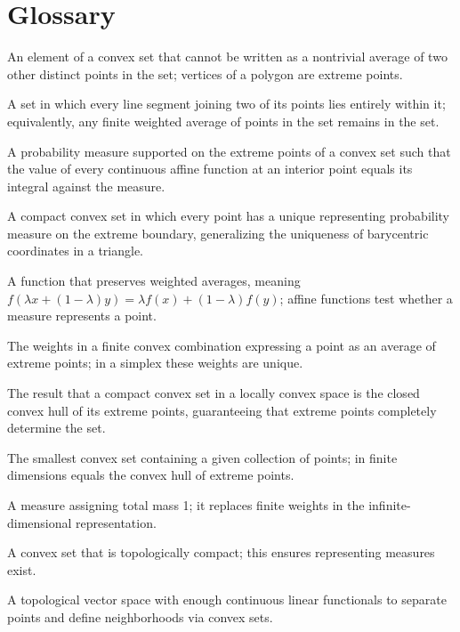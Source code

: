 \section*{Glossary}
\begin{description}[leftmargin=*,style=nextline,itemsep=0.3em]

\item[\textbf{Extreme point.}] An element of a convex set that cannot be written as a nontrivial average of two other distinct points in the set; vertices of a polygon are extreme points.

\item[\textbf{Convex set.}] A set in which every line segment joining two of its points lies entirely within it; equivalently, any finite weighted average of points in the set remains in the set.

\item[\textbf{Representing measure.}] A probability measure supported on the extreme points of a convex set such that the value of every continuous affine function at an interior point equals its integral against the measure.

\item[\textbf{Choquet simplex.}] A compact convex set in which every point has a unique representing probability measure on the extreme boundary, generalizing the uniqueness of barycentric coordinates in a triangle.

\item[\textbf{Affine function.}] A function that preserves weighted averages, meaning $f(\lambda x+(1-\lambda)y)=\lambda f(x)+(1-\lambda)f(y)$; affine functions test whether a measure represents a point.

\item[\textbf{Barycentric coordinates.}] The weights in a finite convex combination expressing a point as an average of extreme points; in a simplex these weights are unique.

\item[\textbf{Krein--Milman theorem.}] The result that a compact convex set in a locally convex space is the closed convex hull of its extreme points, guaranteeing that extreme points completely determine the set.

\item[\textbf{Convex hull.}] The smallest convex set containing a given collection of points; in finite dimensions equals the convex hull of extreme points.

\item[\textbf{Probability measure.}] A measure assigning total mass 1; it replaces finite weights in the infinite-dimensional representation.

\item[\textbf{Compact convex set.}] A convex set that is topologically compact; this ensures representing measures exist.

\item[\textbf{Locally convex space.}] A topological vector space with enough continuous linear functionals to separate points and define neighborhoods via convex sets.

\end{description}


